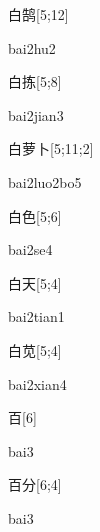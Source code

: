 \begin{verbete}[bai2hu2]{白鹄}[5;12]
\begin{pronuncia}{bai2hu2}
\end{pronuncia}
\end{verbete}

\begin{verbete}{白拣}[5;8]
\begin{pronuncia}{bai2jian3}
\end{pronuncia}
\end{verbete}

\begin{verbete}{白萝卜}[5;11;2]
\begin{pronuncia}{bai2luo2bo5}
\end{pronuncia}
\end{verbete}

\begin{verbete}[bai2se4]{白色}[5;6]
\begin{pronuncia}{bai2se4}
\end{pronuncia}
\end{verbete}

\begin{verbete}{白天}[5;4]
\begin{pronuncia}{bai2tian1}
\end{pronuncia}
\end{verbete}

\begin{verbete}{白苋}[5;4]
\begin{pronuncia}{bai2xian4}
\end{pronuncia}
\end{verbete}

\begin{verbete}[bai3]{百}[6]
\begin{pronuncia}{bai3}
\end{pronuncia}
\end{verbete}

\begin{verbete}[bai3]{百分}[6;4]
\begin{pronuncia}{bai3}
\end{pronuncia}
\end{verbete}

